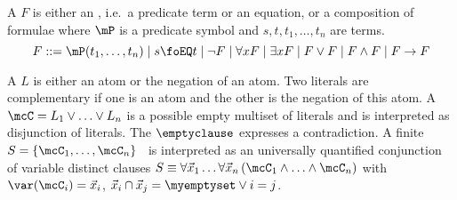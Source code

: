 %
\begin{definition}\label{def:first-order}
A  \( F \) is either an
, i.e.~a predicate term or an equation, or a composition of formulae where \( \mP \) is a predicate symbol and \( s,t,t_1,\ldots,t_n \) are terms.
%
\[
 F ::= \mP(t_1,\ldots,t_n) \mid
	s \foEQ t \mid
	\lnot F \mid
	\forall x F \mid
	\exists x F \mid
	 F\lor F \mid
	 F\land F \mid
	 F\rightarrow F
\]
\end{definition}
\begin{definition}\label{def:literals}
A  \( L \) is either an atom
or the negation of an atom.
Two literals are complementary if one is an atom and the other is the negation of this atom.
%
A \ \ \( \mcC = L_1\lor\ldots\lor L_n \)  is a possible empty multiset of literals and is interpreted as disjunction of literals.
The  \( \emptyclause \) expresses a contradiction.
A finite  \( S=\{ \mcC_1,\ldots,\mcC_n \} \) 
is interpreted as an universally quantified conjunction of variable distinct clauses
\( S\equiv\forall\vec{x}_1\ldots\forall\vec{x}_n\left(\mcC_1\land\ldots\land\mcC_n\right) \) with
\( \var(\mcC_i)=\vec{x}_i \),
\( \vec{x}_i\cap\vec{x}_j=\myemptyset\lor i=j \).
\end{definition}
